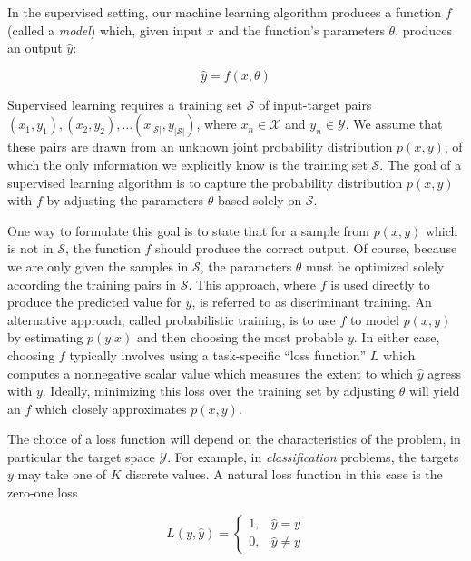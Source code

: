 In the supervised setting, our machine learning algorithm produces a function $f$ (called a {\em model}) which, given input $x$ and the function's parameters $\theta$, produces an output $\hat{y}$:

\begin{equation}
\hat{y} = f(x, \theta)
\end{equation}

Supervised learning requires a training set $\mathcal{S}$ of input-target pairs $(x_1, y_1), (x_2, y_2), \ldots (x_{|\mathcal{S}|}, y_{|\mathcal{S}|})$, where $x_n \in \mathcal{X}$ and $y_n \in \mathcal{Y}$.
We assume that these pairs are drawn from an unknown joint probability distribution $p(x, y)$, of which the only information we explicitly know is the training set $\mathcal{S}$.
The goal of a supervised learning algorithm is to capture the probability distribution $p(x, y)$ with $f$ by adjusting the parameters $\theta$ based solely on $\mathcal{S}$.

One way to formulate this goal is to state that for a sample from $p(x, y)$ which is not in $\mathcal{S}$, the function $f$ should produce the correct output.
Of course, because we are only given the samples in $\mathcal{S}$, the parameters $\theta$ must be optimized solely according the training pairs in $\mathcal{S}$.
This approach, where $f$ is used directly to produce the predicted value for $y$, is referred to as discriminant training.
An alternative approach, called probabilistic training, is to use $f$ to model $p(x, y)$ by estimating $p(y | x)$ and then choosing the most probable $y$.
In either case, choosing $f$ typically involves using a task-specific ``loss function'' $L$ which computes a nonnegative scalar value which measures the extent to which $\hat{y}$ agress with $y$.
Ideally, minimizing this loss over the training set by adjusting $\theta$ will yield an $f$ which closely approximates $p(x, y)$.

The choice of a loss function will depend on the characteristics of the problem, in particular the target space $\mathcal{Y}$.
For example, in {\em classification} problems, the targets $y$ may take one of $K$ discrete values.
A natural loss function in this case is the zero-one loss

\begin{equation}
L(y, \hat{y}) = \begin{cases}
1,& \hat{y} = y\\
0,& \hat{y} \ne y
\end{cases}
\end{equation}

